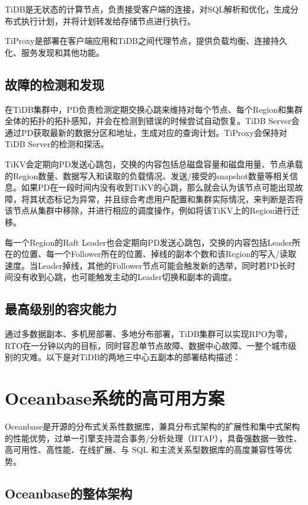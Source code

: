 TiDB是无状态的计算节点，负责接受客户端的连接，对SQL解析和优化，生成分布式执行计划，并将计划转发给存储节点进行执行。

TiProxy是部署在客户端应用和TiDB之间代理节点，提供负载均衡、连接持久化、服务发现和其他功能。


\subsection{故障的检测和发现}

在TiDB集群中，PD负责检测定期交换心跳来维持对每个节点、每个Region和集群全体的拓扑的拓扑感知，并会在检测到错误的时候尝试自动恢复。TiDB Server会通过PD获取最新的数据分区和地址，生成对应的查询计划。TiProxy会保持对TiDB Server的检测和探活。

TiKV会定期向PD发送心跳包，交换的内容包括总磁盘容量和磁盘用量、节点承载的Region数量、数据写入和读取的负载情况、发送/接受的snapshot数量等相关信息。如果PD在一段时间内没有收到TiKV的心跳，那么就会认为该节点可能出现故障，将其状态标记为异常，并且综合考虑用户配置和集群实际情况，来判断是否将该节点从集群中移除，并进行相应的调度操作，例如将该TiKV上的Region进行迁移。

每一个Region的Raft Leader也会定期向PD发送心跳包，交换的内容包括Leader所在的位置、每一个Follower所在的位置、掉线的副本个数和该Region的写入/读取速度。当Leader掉线，其他的Follower节点可能会触发新的选举，同时若PD长时间没有收到心跳，也可能触发主动的Leader切换和副本的调度。

\subsection{最高级别的容灾能力}

通过多数据副本、多机房部署、多地分布部署，TiDB集群可以实现RPO为零，RTO在一分钟以内的目标，同时容忍单节点故障、数据中心故障、一整个城市级别的灾难。以下是对TiDB的两地三中心五副本的部署结构描述：




\section{Oceanbase系统的高可用方案}

Oceanbase是开源的分布式关系性数据库，兼具分布式架构的扩展性和集中式架构的性能优势，过单一引擎支持混合事务/分析处理（HTAP），具备强数据一致性、高可用性、高性能、在线扩展、与 SQL 和主流关系型数据库的高度兼容性等优势。

\subsection{Oceanbase的整体架构}

